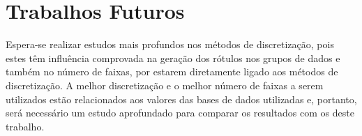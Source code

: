 



\section{Trabalhos Futuros}\label{cap:fut}



Espera-se realizar estudos mais profundos nos métodos de discretização, pois estes têm influência comprovada na geração dos rótulos nos grupos de dados e também no número de faixas, por estarem diretamente ligado aos métodos de discretização. A melhor discretização e o melhor número de faixas a serem utilizados estão relacionados aos valores das bases de dados utilizadas e, portanto, será necessário um estudo aprofundado para comparar os resultados com os deste trabalho. 

